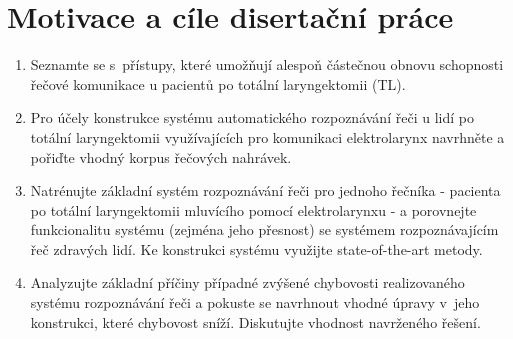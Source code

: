 \ifdefined\CELE
\else

\fi

\chapter{Motivace a cíle disertační práce}
\label{chap:mot}

\begin{enumerate}
  \item Seznamte se s~přístupy, které umožňují alespoň částečnou obnovu schopnosti řečové komunikace u pacientů po totální laryngektomii (TL).
  \item Pro účely konstrukce systému automatického rozpoznávání řeči u lidí po totální laryngektomii využívajících pro komunikaci elektrolarynx navrhněte a pořiďte vhodný korpus řečových nahrávek.
  \item Natrénujte základní systém rozpoznávání řeči pro jednoho řečníka - pacienta po totální laryngektomii mluvícího pomocí elektrolarynxu - a porovnejte funkcionalitu systému (zejména jeho přesnost) se systémem rozpoznávajícím řeč zdravých lidí. Ke konstrukci systému využijte state-of-the-art metody.
  \item Analyzujte základní příčiny případné zvýšené chybovosti realizovaného systému rozpoznávání řeči a pokuste se navrhnout vhodné úpravy v~jeho konstrukci, které chybovost sníží. Diskutujte vhodnost navrženého řešení.
\end{enumerate}

\ifdefined\CELE
\else

\fi

